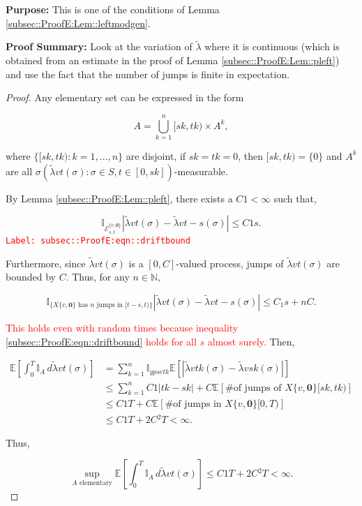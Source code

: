 \documentclass[12pt]{article}
\newcommand{\mb}{\mathbb}
\newcommand{\mc}{\mathcal}
\newcommand{\te}{\text}
\newcommand{\tr}{\textcolor{red}}
\newcommand{\labe}[1]{\tr{\texttt{Label: #1}}}
\newcommand{\purpose}{\textbf{Purpose: }}
\newcommand{\pfsum}{\textbf{Proof Summary: }}
\newcommand{\ex}[1]{\mb{E}\left[#1\right]}			%
\renewcommand{\root}{\mathbf{0}}				%
\renewcommand{\v}{v}							%
\renewcommand{\S}{S}							%
\newcommand{\s}{\sigma}							%
\newcommand{\T}{T}								%
\renewcommand{\t}{t}							%
\renewcommand{\tt}{s}							%
\newcommand{\X}{X}								%
\newcommand{\const}{C}							%
\newcommand{\sln}[1]{^{#1}}						%
\newcommand{\alt}[1]{\widetilde{#1}}			%
\renewcommand{\it}{k}							%
\newcommand{\evnt}{\mc{E}}						%
\newcommand{\typset}{A}							%
\newcommand{\crate}{\alt{\lambda}}				%
\begin{document}
\purpose This is one of the conditions of Lemma \ref{subsec::ProofE:Lem::leftmodgen}.

\pfsum Look at the variation of \(\crate\) where it is continuous (which is obtained from an estimate in the proof of Lemma \ref{subsec::ProofE:Lem::pleft}) and use the fact that the number of jumps is finite in expectation.

\begin{proof}
Any elementary set can be expressed in the form

\[\typset = \bigcup_{\it = 1}^n [\tt{\it},\t{\it})\times \typset\sln{\it},\]

where \(\{[\tt{\it},\t{\it}):\it=1,\dots,n\}\) are disjoint, if \(\tt{\it} = \t{\it} = 0\), then \([\tt{\it},\t{\it}) = \{0\}\) and \(\typset\sln{\it}\) are all \(\sigma(\crate{\v}{\t}(\s):\s \in \S,\t\in [0,\tt{\it}])\)-measurable. 

By Lemma \ref{subsec::ProofE:Lem::pleft}, there exists a \(\const{1} < \infty\) such that,

\begin{equation}
\mb{I}_{\evnt{}^{\{\v,\root\}}_{\tt,\t}}|\crate{\v}{\t}(\s) - \crate{\v}{\t-\tt}(\s)| \leq \const{1}\tt.
\label{subsec::ProofE:eqn::driftbound}
\end{equation}
\labe{subsec::ProofE:eqn::driftbound}

Furthermore, since \(\crate{\v}{\t}(\s)\) is a \([0,\const{}]\)-valued process, jumps of \(\crate{\v}{\t}(\s)\) are bounded by \(\const{}\). Thus, for any \(n \in \mb{N}\),

\[\mb{I}_{\{\X{\{\v,\root\}}{}\te{ has }n\te{ jumps in } [\t-\tt,\t)\}}|\crate{\v}{\t}(\s) - \crate{\v}{\t-\tt}(\s)|\leq C_1\tt + n \const{}.\]

\tr{This holds even with random times because inequality \eqref{subsec::ProofE:eqn::driftbound} holds for all \(\tt\) almost surely.} Then,

\begin{align*}
\ex{\int_0^\T \mb{I}_\typset\,d\crate{\v}{\t}(\s)} &= \sum_{\it = 1}^n \mb{I}_{	ypset{\it}}\ex{\left|\crate{\v}{\t{k}}(\s) - \crate{\v}{\tt{\it}}(\s)\right|}\\
&\leq \sum_{\it=1}^n \const{1}|\t{\it} - \tt{\it}| + \const{}\ex{\te{\# of jumps of }\X{\{\v,\root\}}{[\tt{\it},\t{\it})}}\\
&\leq \const{1}\T + \const{}\ex{\te{\# of jumps in }\X{\{\v,\root\}}{[0,\T)}}\\
&\leq \const{1}\T + 2\const{}^2\T < \infty.
\end{align*}

Thus,

\[\sup_{\typset\te{ elementary}} \ex{\int_0^\T \mb{I}_\typset\,d\crate{\v}{\t}(\s)} \leq \const{1}\T + 2\const{}^2\T < \infty.\]
\end{proof}
\end{document}
